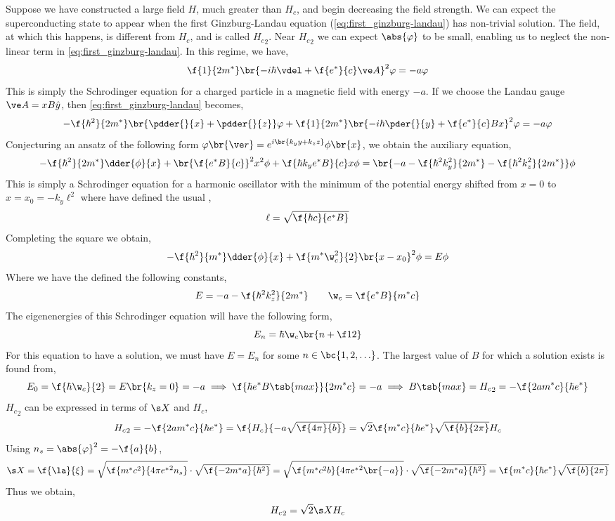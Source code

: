 \documentclass{article}
\newcommand{\vp}{\varphi}
\begin{document}
Suppose we have constructed a large field $H$, much greater than $H_c$, and begin decreasing the field strength. We can expect the superconducting state to appear when the first Ginzburg-Landau equation (\cref{eq:first_ginzburg-landau}) has non-trivial solution. The field, at which this happens, is different from $H_c$, and is called ${H_c}_2$. Near ${H_c}_2$ we can expect $\abs{\vp}$ to be small, enabling us to neglect the non-linear term in \cref{eq:first_ginzburg-landau}. In this regime, we have,
\[ \f{1}{2m^*}\br{-i\hbar \vdel + \f{e^*}{c} \ve A}^2 \vp = - a \vp \]
This is simply the Schrodinger equation for a charged particle in a magnetic field with energy $-a$. If we choose the Landau gauge $\ve A = x B \hat y$, then \cref{eq:first_ginzburg-landau} becomes,
\[ - \f{\hbar^2}{2m^*}\br{\pdder{}{x} + \pdder{}{z}} \vp + \f{1}{2m^*}\br{-i\hbar \pder{}{y} + \f{e^*}{c} B x}^2 \vp = - a \vp \]
Conjecturing an ansatz of the following form $\vp\br{\ve r} = e^{i\br{k_y y + k_z z}} \phi\br{x}$, we obtain the auxiliary equation,
\[ -\f{\hbar^2}{2m^*}\dder{\phi}{x} + \br{\f{e^*B}{c}}^2 x^2 \phi + \f{\hbar k_y e^* B}{c}x \phi = \br{-a - \f{\hbar^2k_y^2}{2m^*}- \f{\hbar^2k_z^2}{2m^*}} \phi\]
This is simply a Schrodinger equation for a harmonic oscillator with the minimum of the potential energy shifted from $x = 0$ to $x = x_0 = - k_y \ell^2$ where have defined the usual ,
\[ \ell = \sqrt{\f{\hbar c}{e^* B}} \]
Completing the square we obtain,
\[ - \f{\hbar^2}{m^*}\dder{\phi}{x} + \f{m^* \w_c^2}{2}\br{x - x_0}^2 \phi = E \phi \]
Where we have the defined the following constants,
\[ E = - a - \f{\hbar^2 k_z^2}{2m^*} \qquad \w_c = \f{e^* B}{m^* c} \]
The eigenenergies of this Schrodinger equation will have the following form,
\[ E_n = \hbar \w_c \br{n + \f12} \]
For this equation to have a solution, we must have $E = E_n$ for some $n \in \bc{1,2,\ldots}$. The largest value of $B$ for which a solution exists is found from,
\[ E_0 = \f{\hbar \w_c}{2} = E\br{k_z = 0} = -a \implies \f{\hbar e^* B\tsb{max}}{2m^* c} = - a \implies B\tsb{max} = {H_c}_2 = - \f{2am^*c}{\hbar e^*}\]
${H_c}_2$ can be expressed in terms of $\s X$ and $H_c$,
\[ {H_c}_2 = - \f{2am^*c}{\hbar e^*} = \f{H_c}{-a \sqrt{\f{4\pi}{b}}} = \sqrt{2}\f{m^* c}{\hbar e^*} \sqrt{\f{b}{2\pi}} H_c \]
Using $n_s = \abs{\vp}^2 = - \f{a}{b}$,
\[ \s X = \f{\la}{\xi} = \sqrt{\f{m^* c^2}{4 \pi {e^*}^2 n_s}} \cdot \sqrt{\f{- 2 m^* a}{\hbar^2}} = \sqrt{\f{m^* c^2 b}{4 \pi {e^*}^2 \br{-a}}} \cdot \sqrt{\f{- 2 m^* a}{\hbar^2}} = \f{m^* c}{\hbar e^*} \sqrt{\f{b}{2\pi}} \]
Thus we obtain,
\[ {H_c}_2 = \sqrt{2}\s X H_c \]
\end{document}
